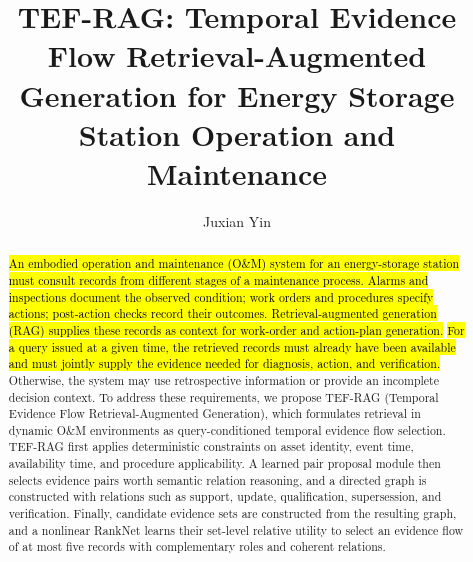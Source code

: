 \documentclass[letterpaper,10pt,conference]{IEEEtran}
\title{TEF-RAG: Temporal Evidence Flow Retrieval-Augmented Generation for Energy Storage Station Operation and Maintenance}
\author{Juxian Yin}
\newcommand{\revhl}[1]{\hl{#1}}
\begin{document}
\maketitle

\begin{abstract}
\revhl{An embodied operation and maintenance (O\&M) system for an energy-storage station must consult records from different stages of a maintenance process. Alarms and inspections document the observed condition; work orders and procedures specify actions; post-action checks record their outcomes. Retrieval-augmented generation (RAG) supplies these records as context for work-order and action-plan generation.}
\revhl{For a query issued at a given time, the retrieved records must already have been available and must jointly supply the evidence needed for diagnosis, action, and verification.} Otherwise, the system may use retrospective information or provide an incomplete decision context.
To address these requirements, we propose TEF-RAG (Temporal Evidence Flow Retrieval-Augmented Generation), which formulates retrieval in dynamic O\&M environments as query-conditioned temporal evidence flow selection.
% 
TEF-RAG first applies deterministic constraints on asset identity, event time, availability time, 
and procedure applicability. 
% 
A learned pair proposal module then selects evidence pairs worth semantic relation reasoning, and a directed graph is constructed with relations such as support, update, qualification, supersession, and verification. 
% 
Finally, candidate evidence sets are constructed from the resulting graph, and a nonlinear RankNet learns their set-level relative utility to select an evidence flow of at most five records with complementary roles and coherent relations.

\end{abstract}
\end{document}
